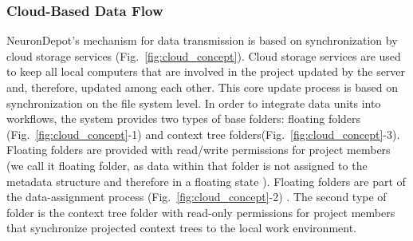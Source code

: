 \documentclass{frontiersSCNS} %
\begin{document}
\subsubsection{Cloud-Based Data Flow}

NeuronDepot's mechanism for data transmission is based on synchronization by
cloud storage services (Fig.~\ref{fig:cloud_concept}). Cloud storage services
are used to keep all local computers that are involved in the project updated
by the server and, therefore, updated among each other. This core update
process is based on synchronization on the file system level. In order to
integrate data units into workflows, the system provides two types of base
folders: floating folders (Fig.~\ref{fig:cloud_concept}-1) and context tree
folders(Fig.~\ref{fig:cloud_concept}-3). Floating folders are provided with
read/write permissions for project members (we call it floating folder, as data
within that folder is not assigned to the metadata structure and therefore in a
floating state ). Floating folders are part of the data-assignment process
(Fig.~\ref{fig:cloud_concept}-2) . The second type of folder is the context
tree folder with read-only permissions for project members that synchronize
projected context trees to the local work environment.
\end{document}
